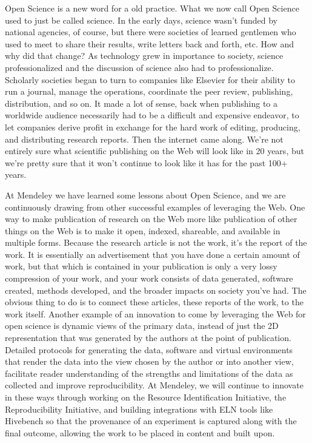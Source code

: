 \documentclass[a4paper,UKenglish]{dagrep}
\begin{document}
{}
\license
Open Science is a new word for a old practice. What we now call Open Science
used to just be called science. In the early days, science wasn't funded by
national agencies, of course, but there were societies of learned gentlemen who
used to meet to share their results, write letters back and forth, etc. How and
why did that change? As technology grew in importance to society, science
professionalized and the discussion of science also had to professionalize.
Scholarly societies began to turn to companies like Elsevier for their ability
to run a journal, manage the operations, coordinate the peer review, publishing,
distribution, and so on. It made a lot of sense, back when publishing to a
worldwide audience necessarily had to be a difficult and expensive endeavor, to
let companies derive profit in exchange for the hard work of editing, producing,
and distributing research reports. Then the internet came along. We're not
entirely sure what scientific publishing on the Web will look like in 20 years,
but we're pretty sure that it won't continue to look like it has for the past
100+ years.

At Mendeley we have learned some lessons about Open Science, and we are
continuously drawing from other successful examples of leveraging the Web. One
way to make publication of research on the Web more like publication of other
things on the Web is to make it open, indexed, shareable, and available in
multiple forms. Because the research article is not the work, it's the report of
the work. It is essentially an advertisement that you have done a certain amount
of work, but that which is contained in your publication is only a very lossy
compression of your work, and your work consists of data generated, software
created, methods developed, and the broader impacts on society you've had. The
obvious thing to do is to connect these articles, these reports of the work, to
the work itself. Another example of an innovation to come by leveraging the Web
for open science is dynamic views of the primary data, instead of just the 2D
representation that was generated by the authors at the point of publication.
Detailed protocols for generating the data, software and virtual environments
that render the data into the view chosen by the author or into another view,
facilitate reader understanding of the strengths and limitations of the data as
collected and improve reproducibility. At Mendeley, we will continue to innovate
in these ways through working on the Resource Identification Initiative, the
Reproducibility Initiative, and building integrations with ELN tools like
Hivebench so that the provenance of an experiment is captured along with the
final outcome, allowing the work to be placed in content and built upon.
 
\end{document}

